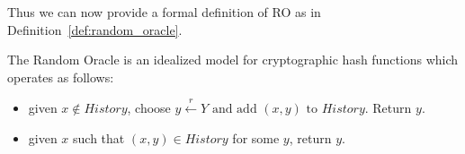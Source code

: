 Thus we can now provide a formal definition of RO as in Definition~\ref{def:random_oracle}.

\begin{defn}
	\label{def:random_oracle}
	The Random Oracle is an idealized model for cryptographic hash functions which operates as follows:
	\begin{itemize}
		\item given $x \notin \textit{History}$, choose $y \xleftarrow{r} Y \text{ and add } (x,y) \text{ to } \textit{History}$. Return $y$.
		\item given $x$ such that $(x,y) \in \textit{History}$ for some $y$, return $y$.
	\end{itemize}
\end{defn}